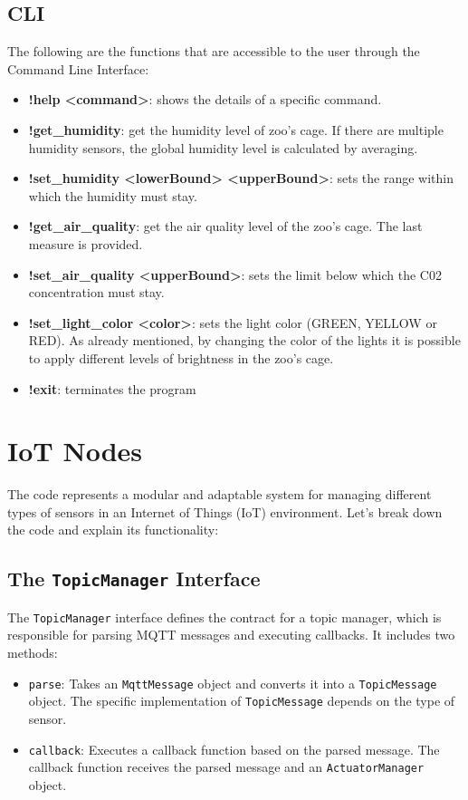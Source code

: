 \documentclass[parskip=full]{report}
\begin{document}
\subsection{CLI}
The following are the functions that are accessible to the user through the Command Line Interface:
\begin{itemize}
	\item \textbf{!help <command>}: shows the details of a specific command. 
	\item \textbf{!get\_humidity}: get the humidity level of zoo's cage. If there are multiple humidity sensors, the
	global humidity level is calculated by averaging.
	\item \textbf{!set\_humidity <lowerBound> <upperBound>}: sets the range within which the humidity must stay.
	\item \textbf{!get\_air\_quality}: get the air quality level of the zoo's cage. The last measure is provided.
	\item \textbf{!set\_air\_quality <upperBound>}: sets the limit below which the C02 concentration must stay.
	\item \textbf{!set\_light\_color <color>}: sets the light color (GREEN, YELLOW or RED). As already mentioned, by
	changing the color of the lights it is possible to apply different levels of brightness in the zoo's cage.
	\item \textbf{!exit}: terminates the program
\end{itemize}
\section{IoT Nodes}

	
	
	The code represents a modular and adaptable system for managing different types of sensors in an Internet of Things (IoT) environment. Let's break down the code and explain its functionality:
	
	\subsection{The \texttt{TopicManager} Interface}
	
	The \texttt{TopicManager} interface defines the contract for a topic manager, which is responsible for parsing MQTT messages and executing callbacks. It includes two methods:
	
	\begin{itemize}
		\item \texttt{parse}: Takes an \texttt{MqttMessage} object and converts it into a \texttt{TopicMessage} object. The specific implementation of \texttt{TopicMessage} depends on the type of sensor.
		\item \texttt{callback}: Executes a callback function based on the parsed message. The callback function receives the parsed message and an \texttt{ActuatorManager} object.
	\end{itemize}
	
\end{document}
